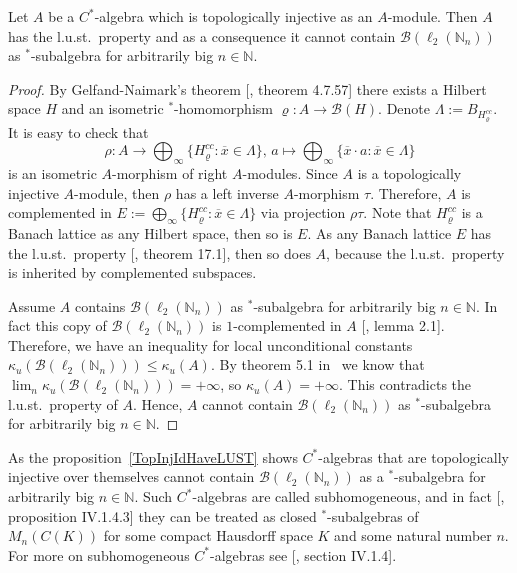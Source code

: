 \begin{proposition}\label{TopInjIdHaveLUST} Let $A$ be a $C^*$-algebra which is
topologically injective as an $A$-module. Then $A$ has the l.u.st.\ property and
as a consequence it cannot contain  $\mathcal{B}(\ell_2(\mathbb{N}_n))$ as
${}^*$-subalgebra for arbitrarily big $n\in\mathbb{N}$.
\end{proposition}
\begin{proof} By Gelfand-Naimark's theorem [\cite{HelBanLocConvAlg}, theorem
4.7.57] there exists a Hilbert space $H$ and an isometric ${}^*$-homomorphism
$\varrho:A\to\mathcal{B}(H)$. Denote $\Lambda:=B_{H_\varrho^{cc}}$. It is easy
to check that 
$$
\rho:
A
    \to
\bigoplus\nolimits_\infty \{H_\varrho^{cc}:\overline{x}\in \Lambda \},\, 
a
    \mapsto 
\bigoplus\nolimits_\infty \{\overline{x}\cdot a:\overline{x}\in \Lambda \}
$$
is an isometric $A$-morphism of right $A$-modules. Since $A$ is a topologically
injective $A$-module, then $\rho$ has a left inverse $A$-morphism $\tau$.
Therefore, $A$ is complemented in $E:=\bigoplus_\infty
\{H_\varrho^{cc}:\overline{x}\in \Lambda \}$ via projection $\rho\tau$. Note
that $H_{\varrho}^{cc}$ is a Banach lattice as any Hilbert space, then so is
$E$. As any Banach lattice $E$ has the l.u.st.\ property [\cite{DiestAbsSumOps},
theorem 17.1], then so does $A$, because the l.u.st.\ property is inherited by
complemented subspaces.

Assume $A$ contains $\mathcal{B}(\ell_2(\mathbb{N}_n))$ as ${}^*$-subalgebra for
arbitrarily big $n\in\mathbb{N}$. In fact this copy of
$\mathcal{B}(\ell_2(\mathbb{N}_n))$ is $1$-complemented in $A$
[\cite{LauLoyWillisAmnblOfBanAndCStarAlgsOfLCG}, lemma 2.1]. Therefore, we have
an inequality for local unconditional constants
$\kappa_u(\mathcal{B}(\ell_2(\mathbb{N}_n)))\leq \kappa_u(A)$. By theorem 5.1
in~\cite{GorLewAbsSmOpAndLocUncondStrct} we know that $\lim_n
\kappa_u(\mathcal{B}(\ell_2(\mathbb{N}_n)))=+\infty$, so $\kappa_u(A)=+\infty$.
This contradicts the l.u.st.\ property of $A$. Hence, $A$ cannot contain
$\mathcal{B}(\ell_2(\mathbb{N}_n))$ as ${}^*$-subalgebra for arbitrarily big 
$n\in\mathbb{N}$.
\end{proof}

As the proposition~\ref{TopInjIdHaveLUST} shows $C^*$-algebras that are
topologically injective over themselves cannot contain
$\mathcal{B}(\ell_2(\mathbb{N}_n))$ as a ${}^*$-subalgebra for arbitrarily big 
$n\in\mathbb{N}$. Such $C^*$-algebras are called subhomogeneous, and in fact
[\cite{BlackadarOpAlg}, proposition IV.1.4.3] they can be treated as closed
${}^*$-subalgebras of $M_n(C(K))$ for some compact Hausdorff space $K$ and some
natural number $n$. For more on subhomogeneous $C^*$-algebras see
[\cite{BlackadarOpAlg}, section IV.1.4]. 

